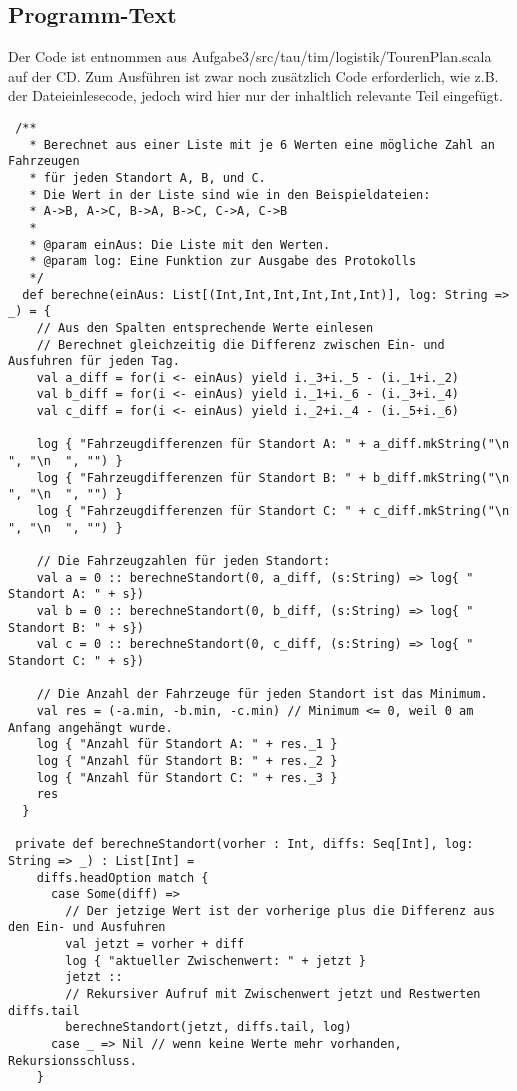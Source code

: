 \subsection{Programm-Text}
Der Code ist entnommen aus Aufgabe3/src/tau/tim/logistik/TourenPlan.scala auf der CD.
Zum Ausführen ist zwar noch zusätzlich Code erforderlich, wie z.B. der Dateieinlesecode, jedoch wird hier nur der inhaltlich relevante Teil eingefügt.
\lstset{language=Scala}
\lstset{basicstyle=\footnotesize}
\begin{lstlisting}
 /**
   * Berechnet aus einer Liste mit je 6 Werten eine mögliche Zahl an Fahrzeugen
   * für jeden Standort A, B, und C.
   * Die Wert in der Liste sind wie in den Beispieldateien:
   * A->B, A->C, B->A, B->C, C->A, C->B
   *
   * @param einAus: Die Liste mit den Werten.
   * @param log: Eine Funktion zur Ausgabe des Protokolls
   */
  def berechne(einAus: List[(Int,Int,Int,Int,Int,Int)], log: String => _) = {
    // Aus den Spalten entsprechende Werte einlesen
    // Berechnet gleichzeitig die Differenz zwischen Ein- und Ausfuhren für jeden Tag.
    val a_diff = for(i <- einAus) yield i._3+i._5 - (i._1+i._2)
    val b_diff = for(i <- einAus) yield i._1+i._6 - (i._3+i._4)
    val c_diff = for(i <- einAus) yield i._2+i._4 - (i._5+i._6)

    log { "Fahrzeugdifferenzen für Standort A: " + a_diff.mkString("\n  ", "\n  ", "") }
    log { "Fahrzeugdifferenzen für Standort B: " + b_diff.mkString("\n  ", "\n  ", "") }
    log { "Fahrzeugdifferenzen für Standort C: " + c_diff.mkString("\n  ", "\n  ", "") }

    // Die Fahrzeugzahlen für jeden Standort:
    val a = 0 :: berechneStandort(0, a_diff, (s:String) => log{ " Standort A: " + s})
    val b = 0 :: berechneStandort(0, b_diff, (s:String) => log{ " Standort B: " + s})
    val c = 0 :: berechneStandort(0, c_diff, (s:String) => log{ " Standort C: " + s})

    // Die Anzahl der Fahrzeuge für jeden Standort ist das Minimum.
    val res = (-a.min, -b.min, -c.min) // Minimum <= 0, weil 0 am Anfang angehängt wurde.
    log { "Anzahl für Standort A: " + res._1 }
    log { "Anzahl für Standort B: " + res._2 }
    log { "Anzahl für Standort C: " + res._3 }
    res
  }

 private def berechneStandort(vorher : Int, diffs: Seq[Int], log: String => _) : List[Int] =
    diffs.headOption match {
      case Some(diff) =>
        // Der jetzige Wert ist der vorherige plus die Differenz aus den Ein- und Ausfuhren
        val jetzt = vorher + diff
        log { "aktueller Zwischenwert: " + jetzt }
        jetzt ::
        // Rekursiver Aufruf mit Zwischenwert jetzt und Restwerten diffs.tail
        berechneStandort(jetzt, diffs.tail, log)
      case _ => Nil // wenn keine Werte mehr vorhanden, Rekursionsschluss.
    }
\end{lstlisting}

